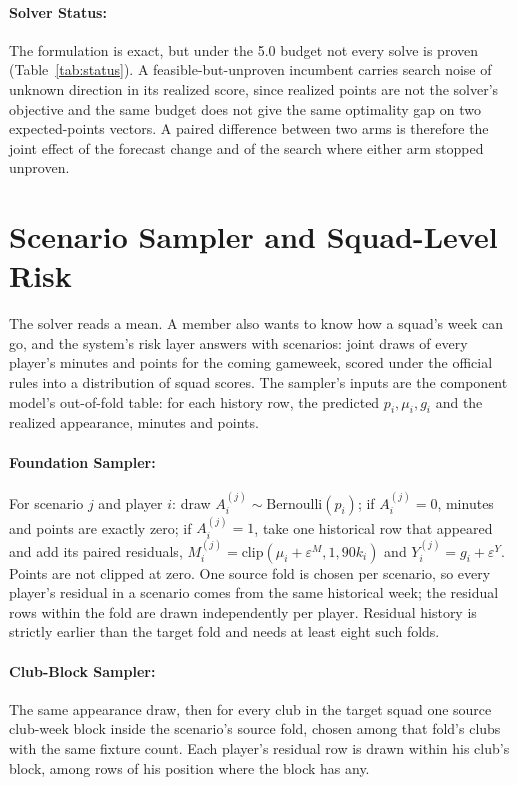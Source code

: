 \documentclass[11pt,a4paper]{article}
\begin{document}
\paragraph{Solver Status:} The formulation is exact, but under the 5.0 budget not every solve is proven (Table~\ref{tab:status}). A feasible-but-unproven incumbent carries search noise of unknown direction in its realized score, since realized points are not the solver's objective and the same budget does not give the same optimality gap on two expected-points vectors. A paired difference between two arms is therefore the joint effect of the forecast change and of the search where either arm stopped unproven.

\section{Scenario Sampler and Squad-Level Risk}
\label{sec:sampler}

The solver reads a mean. A member also wants to know how a squad's week can go, and the system's risk layer answers with scenarios: joint draws of every player's minutes and points for the coming gameweek, scored under the official rules into a distribution of squad scores. The sampler's inputs are the component model's out-of-fold table: for each history row, the predicted $p_i, \mu_i, g_i$ and the realized appearance, minutes and points.

\paragraph{Foundation Sampler:} For scenario $j$ and player $i$: draw $A_i^{(j)} \sim \text{Bernoulli}(p_i)$; if $A_i^{(j)} = 0$, minutes and points are exactly zero; if $A_i^{(j)} = 1$, take one historical row that appeared and add its paired residuals, $M_i^{(j)} = \text{clip}(\mu_i + \varepsilon^M, 1, 90k_i)$ and $Y_i^{(j)} = g_i + \varepsilon^Y$. Points are not clipped at zero. One source fold is chosen per scenario, so every player's residual in a scenario comes from the same historical week; the residual rows within the fold are drawn independently per player. Residual history is strictly earlier than the target fold and needs at least eight such folds.

\paragraph{Club-Block Sampler:} The same appearance draw, then for every club in the target squad one source club-week block inside the scenario's source fold, chosen among that fold's clubs with the same fixture count. Each player's residual row is drawn within his club's block, among rows of his position where the block has any.
\end{document}
